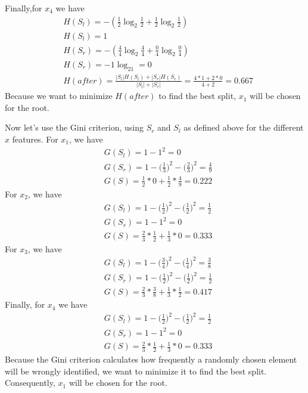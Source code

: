 \documentclass[leqno]{article}
\begin{document}
Finally,for $x_4$ we have
\begin{equation*}
\begin{split}
&H(S_l) = -(\frac{1}{2}\log_2\frac{1}{2} + \frac{1}{2}\log_2\frac{1}{2}) \\
&H(S_l) = 1\\
&H(S_r) = -(\frac{4}{4}\log_2\frac{4}{4} + \frac{0}{4}\log_2\frac{0}{4})\\
&H(S_r) = -1\log_21 = 0\\
&H(after) = \frac{|S_l|H(S_l) + |S_r|H(S_r)}{|S_l| + |S_r|} = \frac{4*1 + 2*0}{4 + 2} = 0.667
\end{split}
\end{equation*}
Because we want to minimize $H(after)$ to find the best split, $x_1$ will be chosen for the root.

\noindent Now let's use the Gini criterion, using $S_r$ and $S_l$ as defined above for the different $x$ features. 
For $x_1$, we have
\begin{equation*}
\begin{split}
&G(S_l) = 1 - 1^2 = 0\\
&G(S_r) = 1 - \Big(\frac{1}{3}\Big)^2 - \Big(\frac{2}{3}\Big)^2 = \frac{4}{9}\\
&G(S) = \frac{1}{2}*0 + \frac{1}{2}*\frac{4}{9} = 0.222
\end{split}
\end{equation*}
For $x_2$, we have
\begin{equation*}
\begin{split}
&G(S_l) = 1 - \Big(\frac{1}{2}\Big)^2 - \Big(\frac{1}{2}\Big)^2 = \frac{1}{2}\\
&G(S_r) = 1 - 1^2 = 0\\
&G(S) = \frac{2}{3}*\frac{1}{2} + \frac{1}{3}*0 = 0.333
\end{split}
\end{equation*}
For $x_3$, we have
\begin{equation*}
\begin{split}
&G(S_l) = 1 - \Big(\frac{3}{4}\Big)^2 - \Big(\frac{1}{4}\Big)^2 = \frac{3}{8}\\
&G(S_r) = 1 - \Big(\frac{1}{2}\Big)^2 - \Big(\frac{1}{2}\Big)^2 = \frac{1}{2}\\
&G(S) = \frac{2}{3}*\frac{3}{8} + \frac{1}{3}*\frac{1}{2} = 0.417
\end{split}
\end{equation*}
Finally, for $x_4$ we have
\begin{equation*}
\begin{split}
&G(S_l) = 1 - \Big(\frac{1}{2}\Big)^2 - \Big(\frac{1}{2}\Big)^2 = \frac{1}{2}\\
&G(S_r) = 1 - 1^2 = 0\\
&G(S) = \frac{2}{3}*\frac{1}{2} + \frac{1}{3}*0 = 0.333
\end{split}
\end{equation*}
Because the Gini criterion calculates how frequently a randomly chosen element will be wrongly identified, we want to minimize it to find the best split. 
Consequently, $x_1$ will be chosen for the root.
\end{document}
